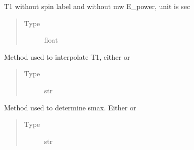 \documentclass[letterpaper,10pt,english]{sphinxmanual}
\begin{document}
\begin{fulllineitems}
\begin{fulllineitems}
\begin{quote}
\begin{description}
\end{description}\end{quote}

\end{fulllineitems}


\begin{fulllineitems}
\label{\detokenize{dnpHydration:dnpLab.dnpHydration.HydrationParameter.T100}}
T1 without spin label and without mw E\_power, unit is sec
\begin{quote}\begin{description}
\item[{Type}] \leavevmode
float

\end{description}\end{quote}

\end{fulllineitems}


\begin{fulllineitems}
\label{\detokenize{dnpHydration:dnpLab.dnpHydration.HydrationParameter.t1_interp_method}}
Method used to interpolate T1, either  or 
\begin{quote}\begin{description}
\item[{Type}] \leavevmode
str

\end{description}\end{quote}

\end{fulllineitems}


\begin{fulllineitems}
\label{\detokenize{dnpHydration:dnpLab.dnpHydration.HydrationParameter.smax_model}}
Method used to determine smax. Either  or 
\begin{quote}\begin{description}
\item[{Type}] \leavevmode
str


\end{description}
\end{quote}
\end{fulllineitems}
\end{fulllineitems}
\end{document}

